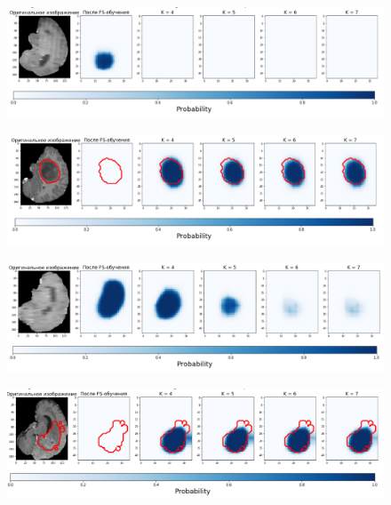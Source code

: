   \begin{figure}[h!] 
  \center
  \includegraphics [scale=0.7] {images/good_19.png}
\end{figure}


  \begin{figure}[h!] 
  \center
  \includegraphics [scale=0.7] {images/good_20.png}
\end{figure}

  \begin{figure}[h!] 
  \center
  \includegraphics [scale=0.7] {images/good_21.png}
  \end{figure} 
  
  \begin{figure}[h!] 
  \center
  \includegraphics [scale=0.7] {images/good_22.png}
\end{figure}



\clearpage